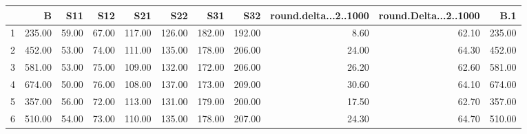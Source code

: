 \begin{table}[ht]
\centering
\begin{tabular}{rrrrrrrrrrr}
  \hline
 & B & S11 & S12 & S21 & S22 & S31 & S32 & round.delta...2..1000 & round.Delta...2..1000 & B.1 \\ 
  \hline
1 & 235.00 & 59.00 & 67.00 & 117.00 & 126.00 & 182.00 & 192.00 & 8.60 & 62.10 & 235.00 \\ 
  2 & 452.00 & 53.00 & 74.00 & 111.00 & 135.00 & 178.00 & 206.00 & 24.00 & 64.30 & 452.00 \\ 
  3 & 581.00 & 53.00 & 75.00 & 109.00 & 132.00 & 172.00 & 206.00 & 26.20 & 62.60 & 581.00 \\ 
  4 & 674.00 & 50.00 & 76.00 & 108.00 & 137.00 & 173.00 & 209.00 & 30.60 & 64.10 & 674.00 \\ 
  5 & 357.00 & 56.00 & 72.00 & 113.00 & 131.00 & 179.00 & 200.00 & 17.50 & 62.70 & 357.00 \\ 
  6 & 510.00 & 54.00 & 73.00 & 110.00 & 135.00 & 178.00 & 207.00 & 24.30 & 64.70 & 510.00 \\ 
   \hline
\end{tabular}
\end{table}
